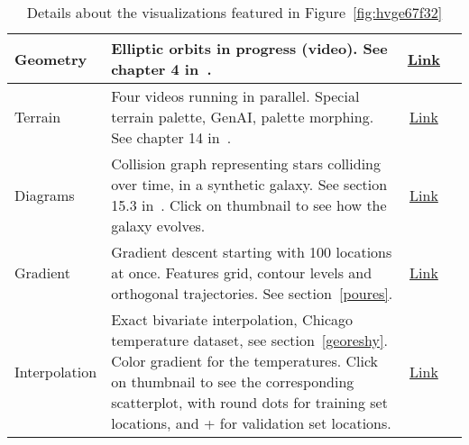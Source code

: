 \documentclass[oneside,10pt]{book}
\begin{document}
\begin{table}[H]
\begin{center}
{\begin{tabular}{p{}|p{}|c p{}}
\hline
Geometry & Elliptic orbits in progress (video). See chapter 4 in~\cite{vgmlbook2022}. & \href{https://github.com/VincentGranville/Visualizations/blob/main/Source-Code/image2.py}{Link}\\
\hline
Terrain &  Four videos running in parallel. Special terrain palette, GenAI, palette morphing. See chapter 14 in~\cite{vgelsevier}. & \href{https://github.com/VincentGranville/Visualizations/blob/main/Source-Code/terrain.py}{Link}\\
\hline
Diagrams & Collision graph representing stars colliding over time, in a synthetic galaxy. See section 15.3 in~\cite{vgelsevier}. Click on thumbnail to see how the galaxy evolves. & \href{https://github.com/VincentGranville/Visualizations/blob/main/Source-Code/nbody_graph.py}{Link}\\
\hline
Gradient & Gradient descent starting with 100 locations at once. Features grid, contour levels and orthogonal trajectories. See section~\ref{poures}. & \href{https://github.com/VincentGranville/Experimental-Math-Number-Theory/blob/main/Source-Code/gradient.py}{Link}\\
\hline
Interpolation &  Exact bivariate interpolation, Chicago temperature dataset, see section~\ref{georeshy}. Color gradient for the temperatures. Click on thumbnail to see the corresponding scatterplot,
with round dots for training set locations, and + for validation set locations.  & \href{https://github.com/VincentGranville/Statistical-Optimization/blob/main/interpol_smooth.py}{Link}\\
\hline		
\end{tabular}
}
\caption{\label{souffre} Details about the visualizations featured in Figure~\ref{fig:hvge67f32}}
\end{center}
\end{table}

%



\end{document}
